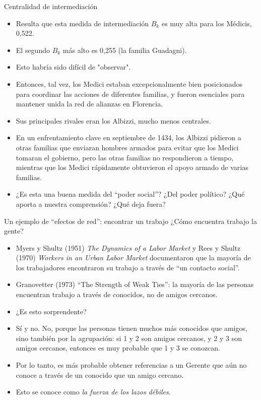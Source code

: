 \documentclass[11pt]{beamer}
\begin{document}
\begin{frame}{Centralidad de intermediación}
\begin{itemize}
\small    \item Resulta que esta medida de intermediación $B_k$ es muy alta para los Médicis, 0,522.
\item El segundo $B_k$ más alto es 0,255 (la familia Guadagni).
\item Esto habría sido difícil de "observar".
\item Entonces, tal vez, los Medici estaban excepcionalmente bien posicionados para coordinar las acciones de diferentes familias, y fueron esenciales para mantener unida la red de alianzas en Florencia.
\item Sus principales rivales eran los Albizzi, mucho menos centrales.
\item En un enfrentamiento clave en septiembre de 1434, los Albizzi pidieron a otras familias que enviaran hombres armados para evitar que los Medici tomaran el gobierno, pero las otras familias no respondieron a tiempo, mientras que los Medici rápidamente obtuvieron el apoyo armado de varias familias.
\item ¿Es esta una buena medida del “poder social”? ¿Del poder político?
¿Qué aporta a nuestra comprensión? ¿Qué deja fuera?
\end{itemize}    
\end{frame}

\begin{frame}{Un ejemplo de “efectos de red”: encontrar un trabajo}
¿Cómo encuentra trabajo la gente?    
 \begin{itemize}
\small    \item Myers y Shultz (1951) \textit{The Dynamics of a Labor Market} y Rees y Shultz (1970) \textit{Workers in an Urban Labor Market} documentaron que la mayoría de los trabajadores encontraron su trabajo a través de “un contacto social”.
\item Granovetter (1973) “The Strength of Weak Ties”: la mayoría de las personas encuentran trabajo a través de conocidos, no de amigos cercanos.
\item ¿Es esto sorprendente?
\item  Sí y no. No, porque las personas tienen muchos más conocidos que amigos, sino también por la agrupación: si 1 y 2 son amigos cercanos, y 2 y 3 son amigos cercanos, entonces es muy probable que 1 y 3 se conozcan.
\item Por lo tanto, es más probable obtener referencias a un Gerente que aún no conoce a través de un conocido que un amigo cercano.
\item Esto se conoce como \textit{la fuerza de los lazos débiles}.

    \end{itemize}
\end{frame}
\end{document}

